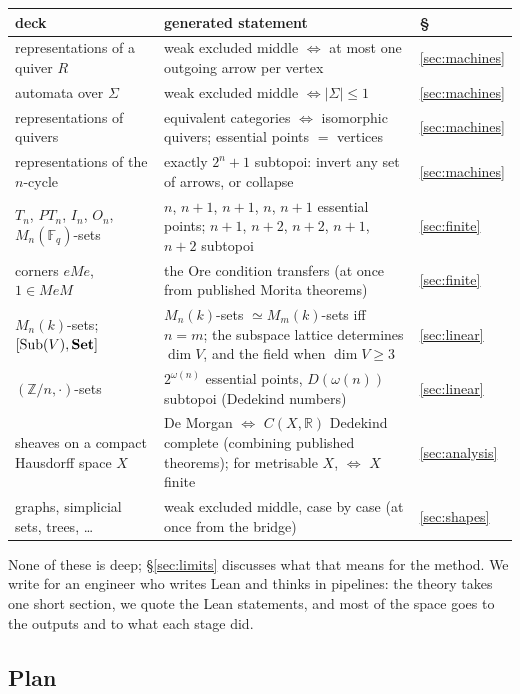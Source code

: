 \begin{center}\small
\begin{tabularx}{\linewidth}{>{\raggedright\arraybackslash}p{4.2cm}>{\raggedright\arraybackslash}X l}
\toprule
deck & generated statement & \S\\
\midrule
representations of a quiver $R$ & weak excluded middle $\iff$ at most one outgoing arrow per vertex & \ref{sec:machines}\\
automata over $\Sigma$ & weak excluded middle $\iff|\Sigma|\le 1$ & \ref{sec:machines}\\
representations of quivers & equivalent categories $\iff$ isomorphic quivers; essential points $=$ vertices & \ref{sec:machines}\\
representations of the $n$-cycle & exactly $2^n+1$ subtopoi: invert any set of arrows, or collapse & \ref{sec:machines}\\
$T_n$, $PT_n$, $I_n$, $O_n$, $M_n(\mathbb F_q)$-sets & $n$, $n{+}1$, $n{+}1$, $n$, $n{+}1$ essential points; $n{+}1$, $n{+}2$, $n{+}2$, $n{+}1$, $n{+}2$ subtopoi & \ref{sec:finite}\\
corners $eMe$, $1\in MeM$ & the Ore condition transfers (at once from published Morita theorems) & \ref{sec:finite}\\
$M_n(k)$-sets; $[\mathrm{Sub}(V),\mathbf{Set}]$ & $M_n(k)$-sets $\simeq M_m(k)$-sets iff $n = m$; the subspace lattice determines $\dim V$, and the field when $\dim V\ge 3$ & \ref{sec:linear}\\
$(\mathbb Z/n,\cdot)$-sets & $2^{\omega(n)}$ essential points, $D(\omega(n))$ subtopoi (Dedekind numbers) & \ref{sec:linear}\\
sheaves on a compact Hausdorff space $X$ & De Morgan $\iff$ $C(X,\mathbb R)$ Dedekind complete (combining published theorems); for metrisable $X$, $\iff$ $X$ finite & \ref{sec:analysis}\\
graphs, simplicial sets, trees, \dots & weak excluded middle, case by case (at once from the bridge) & \ref{sec:shapes}\\
\bottomrule
\end{tabularx}
\end{center}

None of these is deep; \S\ref{sec:limits} discusses what that means for the method. We write for an engineer who writes Lean and thinks in pipelines: the theory takes one short section, we quote the Lean statements, and most of the space goes to the outputs and to what each stage did.

\subsection{Plan}

